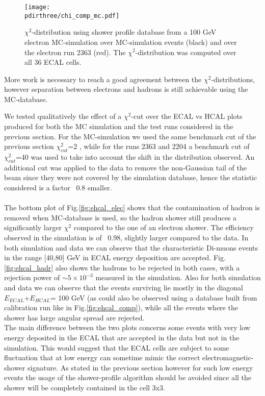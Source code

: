 \begin{figure}[h!]
  \begin{center}
    \texttt{[image: \\pdirthree/chi\_comp\_mc.pdf]}
  \end{center}
  \caption{$\chi^2$-distribution using shower profile database from a
    100 GeV electron MC-simulation over MC-simulation events (black)
    and over the electron run 2363 (red). The $\chi^2$-distribution
    was computed over all 36 ECAL cells.}
  \label{fig:chi_mc}
\end{figure}
\clearpage


More work is necessary to reach a good agreement between the
$\chi^{2}$-distributions, however separation between electrons and
hadrons is still achievable using the MC-database. 

We tested qualitatively the effect of a $\chi^{2}$-cut over the
ECAL vs HCAL plots produced for both the MC simulation
and the test runs considered in the previous section. For the
MC-simulation we used the same benchmark cut of the previous section
$\chi^2_{cut}$=2 , while for the runs 2363 and 2204 a benchmark cut of
$\chi^2_{cut}$=40 was used to take into account the shift in the
distribution observed. An additional cut was applied to the data to
remove the non-Gaussian tail of the beam since they were not covered
by the simulation
database, hence the statistic considered is a factor ~0.8 smaller.\\
\\
The bottom plot of Fig.\ref{fig:ehcal_elec} shows that the
contamination of hadron is removed when MC-database is used, so
the hadron shower still produces a significantly larger $\chi^{2}$
compared to the one of an electron shower. The efficiency
observed in the simulation is of ~0.98, slightly larger compared to the data. 
In both simulation and data we can observe that the characteristic
Di-muons events in the range [40,80] GeV in ECAL energy
deposition are accepted.
Fig.\ref{fig:ehcal_hadr} also shows the hadrons to be rejected in both
cases, with a rejection power of $\sim 5\times 10^{-3}$ measured in the
simulation. Also for both simulation and data we can observe that the
events surviving lie mostly in the diagonal $E_{ECAL}$+$E_{HCAL}$= 100
GeV (as could also be observed using a database built from calibration run like in Fig.\ref{fig:ehcal_comp}), while all the events where the shower has large angular spread are rejected.
\\
The main difference between the two plots concerns some events with very low energy deposited in the ECAL that are accepted in the data but not in the simulation. This would suggest that the ECAL cells are subject to some fluctuation that at low energy can sometime mimic the correct electromagnetic-shower signature. As stated in the previous section however for such low energy events the usage of the shower-profile algorithm should be avoided since all the shower will be completely contained in the cell 3x3.\\


